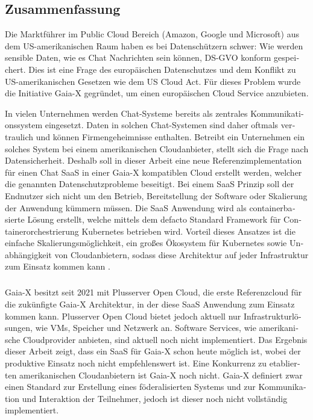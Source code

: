 \begin{otherlanguage}{ngerman}
	\chapter*{Zusammenfassung}

	Die Marktführer im Public Cloud Bereich (Amazon, Google und Microsoft) aus dem US-amerikanischen Raum
	haben es bei Datenschützern schwer:
	Wie werden sensible Daten, wie es Chat Nachrichten sein können, DS-GVO konform gespeichert.
	Dies ist eine Frage des europäischen Datenschutzes und dem Konflikt zu US-amerikanischen Gesetzen wie dem US Cloud Act.
	Für dieses Problem wurde die Initiative Gaia-X gegründet, um einen europäischen Cloud Service anzubieten.

	In vielen Unternehmen werden Chat-Systeme bereits als zentrales Kommunikationssystem eingesetzt.
	Daten in solchen Chat-Systemen sind daher oftmals vertraulich und können Firmengeheimnisse enthalten.
	Betreibt ein Unternehmen ein solches System bei einem amerikanischen Cloudanbieter, stellt sich die Frage nach Datensicherheit.
	Deshalb soll in dieser Arbeit eine neue Referenzimplementation für einen Chat \acf{SaaS} in einer Gaia-X kompatiblen Cloud erstellt werden,
	welcher die genannten Datenschutzprobleme beseitigt.
	Bei einem \ac{SaaS} Prinzip soll der Endnutzer sich nicht um den Betrieb, Bereitstellung der Software
	oder Skalierung der Anwendung kümmern müssen. 
	Die \ac{SaaS} Anwendung wird als containerbasierte Lösung erstellt, welche mittels dem defacto Standard Framework für 
	Containerorchestrierung Kubernetes \cite{Burns2019} betrieben wird. Vorteil dieses Ansatzes ist die einfache Skalierungsmöglichkeit,
	ein großes Ökosystem für Kubernetes sowie Unabhängigkeit von Cloudanbietern, 
	sodass diese Architektur auf jeder Infrastruktur zum Einsatz kommen kann \cite{Burns2019}.
	\paragraph{}
	Gaia-X besitzt seit 2021 mit Plusserver Open Cloud, die erste Referenzcloud für die zukünfigte Gaia-X Architektur,
	in der diese \ac{SaaS} Anwendung zum Einsatz kommen kann.	
	Plusserver Open Cloud bietet jedoch aktuell nur Infrastrukturlösungen, wie \acp{VM}, Speicher und Netzwerk an. 
	Software Services, wie amerikanische Cloudprovider anbieten, sind aktuell noch nicht implementiert.
	Das Ergebnis dieser Arbeit zeigt, dass ein \ac{SaaS} für Gaia-X schon heute möglich ist, 
	wobei der produktive Einsatz noch nicht empfehlenswert ist.
	Eine Konkurrenz zu etablierten amerikanischen Cloudanbietern ist Gaia-X noch nicht. 
	Gaia-X definiert zwar einen Standard zur Erstellung eines föderalisierten Systems und zur Kommunikation und Interaktion 
	der Teilnehmer, jedoch ist dieser noch nicht vollständig implementiert. 

\end{otherlanguage}